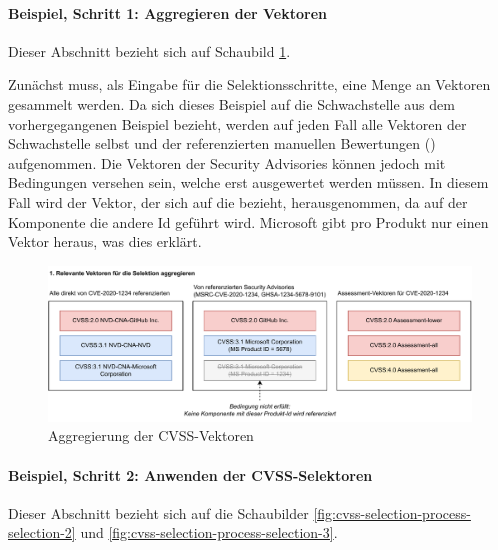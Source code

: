 \paragraph{Beispiel, Schritt 1: Aggregieren der Vektoren} \label{par:projektbericht-loesungsweg-cvss-selection-example-step-1}

Dieser Abschnitt bezieht sich auf Schaubild \ref{fig:cvss-selection-process-selection-1}.

Zunächst muss, als Eingabe für die Selektionsschritte, eine Menge an Vektoren gesammelt werden.
Da sich dieses Beispiel auf die Schwachstelle  aus dem vorhergegangenen Beispiel bezieht, werden auf jeden Fall alle Vektoren der Schwachstelle selbst und der referenzierten manuellen Bewertungen () aufgenommen.
Die Vektoren der Security Advisories können jedoch mit Bedingungen versehen sein, welche erst ausgewertet werden müssen.
In diesem Fall wird der Vektor, der sich auf die  bezieht, herausgenommen, da auf der Komponente die andere Id  geführt wird.
Microsoft gibt pro Produkt nur einen Vektor heraus, was dies erklärt.

\begin{figure}[htbp] %
    \centering
    \includegraphics[width=1\textwidth, keepaspectratio]{res/grafiken/cvss-selection-process-selection-1}
    \caption{Aggregierung der CVSS-Vektoren}
    \label{fig:cvss-selection-process-selection-1}
\end{figure}

\paragraph{Beispiel, Schritt 2: Anwenden der CVSS-Selektoren} \label{par:projektbericht-loesungsweg-cvss-selection-example-step-2}

Dieser Abschnitt bezieht sich auf die Schaubilder \ref{fig:cvss-selection-process-selection-2} und \ref{fig:cvss-selection-process-selection-3}.


